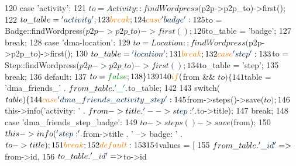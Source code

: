 \begin{DoxyCode}
120                 \textcolor{keywordflow}{case} \textcolor{stringliteral}{'activity'}:
121                     $to = Activity::findWordpress($p2p->p2p\_to)->first();
122                     $to\_table = \textcolor{stringliteral}{'activity'};
123                     \textcolor{keywordflow}{break};
124                 \textcolor{keywordflow}{case} \textcolor{stringliteral}{'badge'}:
125                     $to = Badge::findWordpress($p2p->p2p\_to)->first();
126                     $to\_table = \textcolor{stringliteral}{'badge'};
127                     \textcolor{keywordflow}{break};
128                 \textcolor{keywordflow}{case} \textcolor{stringliteral}{'dma-location'}:
129                     $to = Location::findWordpress($p2p->p2p\_to)->first();
130                     $to\_table = \textcolor{stringliteral}{'location'};
131                     \textcolor{keywordflow}{break};
132                 \textcolor{keywordflow}{case} \textcolor{stringliteral}{'step'}:
133                     $to = Step::findWordpress($p2p->p2p\_to)->first();
134                     $to\_table = \textcolor{stringliteral}{'step'}; 
135                     \textcolor{keywordflow}{break};
136                 \textcolor{keywordflow}{default}:
137                     $to = \textcolor{keyword}{false};
138             \}
139 
140             \textcolor{keywordflow}{if} ($from && $to) \{
141                 $table = \textcolor{stringliteral}{'dma\_friends\_'} . $from\_table . \textcolor{charliteral}{'\_'} . $to\_table;
142 
143                 \textcolor{keywordflow}{switch}($table) \{
144                     \textcolor{keywordflow}{case} \textcolor{stringliteral}{'dma\_friends\_activity\_step'}:
145                         $from->steps()->save($to);
146                         $this->info(\textcolor{stringliteral}{'activity: '} . $from->title . \textcolor{stringliteral}{' --> step: '} . $to->title);
147                         \textcolor{keywordflow}{break};
148                     \textcolor{keywordflow}{case} \textcolor{stringliteral}{'dma\_friends\_step\_badge'}:
149                         $to->steps()->save($from);
150                         $this->info(\textcolor{stringliteral}{'step: '} . $from->title . \textcolor{stringliteral}{' --> badge: '} . $to->title);
151                         \textcolor{keywordflow}{break};
152                     \textcolor{keywordflow}{default}:
153 
154                         $values = [
155                             $from\_table . \textcolor{stringliteral}{'\_id'}   => $from->id,
156                             $to\_table . \textcolor{stringliteral}{'\_id'}     => $to->id

\end{DoxyCode}
